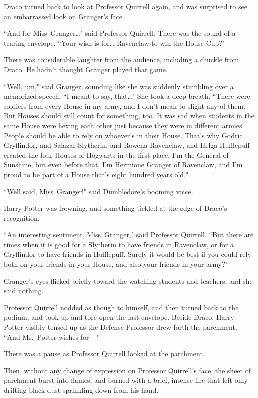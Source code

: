 Draco turned back to look at Professor Quirrell again, and was surprised to see an embarrassed look on Granger's face.

``And for Miss~Granger{\ldots}" said Professor Quirrell. There was the sound of a tearing envelope. ``Your wish is for{\ldots} Ravenclaw to win the House Cup?"

There was considerable laughter from the audience, including a chuckle from Draco. He hadn't thought Granger played that game.

``Well, um," said Granger, sounding like she was suddenly stumbling over a memorized speech, ``I meant to say, that{\ldots}" She took a deep breath. ``There were soldiers from every House in my army, and I don't mean to slight any of them. But Houses should still count for something, too. It was sad when students in the same House were hexing each other just because they were in different armies. People should be able to rely on whoever's in their House. That's why Godric Gryffindor, and Salazar Slytherin, and Rowena Ravenclaw, and Helga Hufflepuff created the four Houses of Hogwarts in the first place. I'm the General of Sunshine, but even before that, I'm Hermione Granger of Ravenclaw, and I'm proud to be part of a House that's eight hundred years old."

``Well said, Miss~Granger!" said Dumbledore's booming voice.

Harry Potter was frowning, and something tickled at the edge of Draco's recognition.

``An interesting sentiment, Miss~Granger," said Professor Quirrell. ``But there are times when it is good for a Slytherin to have friends in Ravenclaw, or for a Gryffindor to have friends in Hufflepuff. Surely it would be best if you could rely both on your friends in your House, and also your friends in your army?"

Granger's eyes flicked briefly toward the watching students and teachers, and she said nothing.

Professor Quirrell nodded as though to himself, and then turned back to the podium, and took up and tore open the last envelope. Beside Draco, Harry Potter visibly tensed up as the Defense Professor drew forth the parchment. ``And Mr.~Potter wishes for---"

There was a pause as Professor Quirrell looked at the parchment.

Then, without any change of expression on Professor Quirrell's face, the sheet of parchment burst into flames, and burned with a brief, intense fire that left only drifting black dust sprinkling down from his hand.

